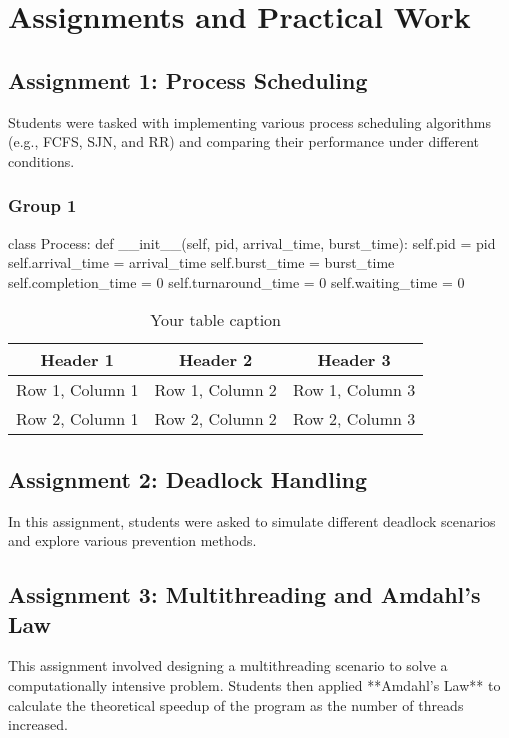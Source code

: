\documentclass[12pt]{article}
\begin{document}
\section{Assignments and Practical Work}
\subsection{Assignment 1: Process Scheduling}
Students were tasked with implementing various process scheduling algorithms (e.g., FCFS, SJN, and RR) and comparing their performance under different conditions.
\subsubsection{Group 1}
\begin{python}
    class Process:
    def __init__(self, pid, arrival_time, burst_time):
        self.pid = pid
        self.arrival_time = arrival_time
        self.burst_time = burst_time
        self.completion_time = 0
        self.turnaround_time = 0
        self.waiting_time = 0
\end{python}

\begin{table}[htbp] %
    \centering
    \begin{tabular}{|c|c|c|} %
    \hline
    Header 1 & Header 2 & Header 3 \\ %
    \hline
    Row 1, Column 1 & Row 1, Column 2 & Row 1, Column 3 \\ %
    \hline
    Row 2, Column 1 & Row 2, Column 2 & Row 2, Column 3 \\ %
    \hline
    \end{tabular}
    \caption{Your table caption} %
    \label{tab:your_label} %
\end{table}

\subsection{Assignment 2: Deadlock Handling}
In this assignment, students were asked to simulate different deadlock scenarios and explore various prevention methods.

\subsection{Assignment 3: Multithreading and Amdahl's Law}
This assignment involved designing a multithreading scenario to solve a computationally intensive problem. Students then applied **Amdahl's Law** to calculate the theoretical speedup of the program as the number of threads increased.
\end{document}

